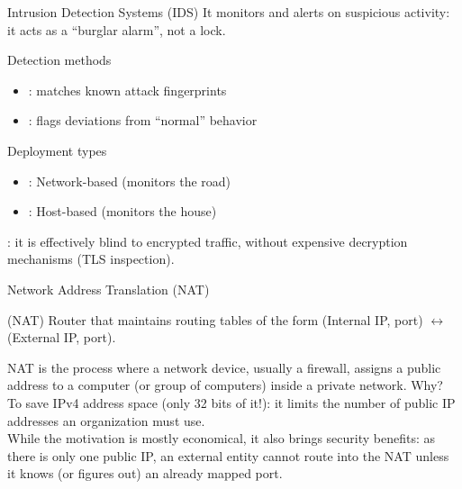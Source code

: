 \begin{parag}{Intrusion Detection Systems (IDS)}
    It monitors and alerts on suspicious activity: it acts as a ``burglar alarm'', not a lock.
	\begin{subparag}{Detection methods}
		\begin{itemize}
		    \item {}: matches known attack fingerprints
		    \item {}: flags deviations from ``normal'' behavior
		\end{itemize}
	\end{subparag}
	\begin{subparag}{Deployment types}
		\begin{itemize}
		    \item {}: Network-based (monitors the road)
		    \item {}: Host-based (monitors the house)
		\end{itemize}
	\end{subparag}
	: it is effectively blind to encrypted traffic, without expensive decryption mechanisms (TLS inspection).
\end{parag}

\begin{parag}{Network Address Translation (NAT)}
    \begin{definition}{(NAT)}
    Router that maintains routing tables of the form (Internal IP, port) $\leftrightarrow$ (External IP, port).
    \end{definition}
	NAT is the process where a network device, usually a firewall, assigns a public address to a computer (or group of computers) inside a private network. Why? To save IPv4 address space (only 32 bits of it!): it limits the number of public IP addresses an organization must use.\\
	While the motivation is mostly economical, it also brings security benefits: as there is only one public IP, an external entity cannot route into the NAT unless it knows (or figures out) an already mapped port.
\end{parag}

